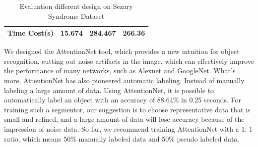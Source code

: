 \begin{table}[b]
{\begin{tabular}{@{}lccc@{}}
Time Cost(s)                                   & 15.674                                                                                                              & 284.467                                                                                                                             & 266.36                                                                                                                                                            \\ \bottomrule
\end{tabular}}
\caption{Evaluation different design on Sezary Syndrome Dataset}
\end{table}

We designed the AttentionNet tool, which provides a new intuition for object recognition, cutting out noise artifacts in the image, which can effectively improve the performance of many networks, such as Alexnet and GoogleNet. What’s more, AttentionNet has also pioneered automatic labeling. Instead of manually labeling a large amount of data. Using AttentionNet, it is possible to automatically label an object with an accuracy of 88.64\% in 0.25 seconds. For training such a segmentor, our suggestion is to choose representative data that is small and refined, and a large amount of data will lose accuracy because of the impression of noise data. So far, we recommend training AttentionNet with a 1: 1 ratio, which means 50\% manually labeled data and 50\% pseudo labeled data.







